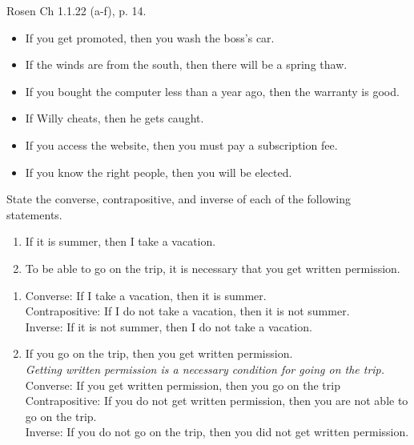 \begin{questions}
 Rosen Ch 1.1.22 (a-f), p. 14.
    \ifprintanswers
        \vspace{-10pt}
    \fi
    \begin{solution}
    \begin{itemize}[itemsep=0pt,parsep=0pt,
    topsep=0pt,partopsep=0pt]
    	\item If you get promoted, then you wash the boss’s car.
        \item If the winds are from the south, then there will be a spring thaw.
    	\item If you bought the computer less than a year ago, then the warranty is good.
    	\item If Willy cheats, then he gets caught.
        \item If you access the website, then you must pay a subscription fee.
        \item If you know the right people, then you will be elected.
    \end{itemize}
    \end{solution}



 State the converse, contrapositive, and inverse of each of the following statements.
    \begin{enumerate}[label=(\alph*),itemsep=0pt,parsep=0pt,topsep=0pt,partopsep=0pt]
        \item If it is summer, then I take a vacation.
        \item To be able to go on the trip, it is necessary that you get written permission.
    \end{enumerate}
    \ifprintanswers
        \vspace{-10pt}
    \fi
    \begin{solution}
    \begin{enumerate}[label=(\alph*),itemsep=0pt,parsep=0pt,topsep=0pt,partopsep=0pt]
        \item Converse: If I take a vacation, then it is summer. \\
            Contrapositive: If I do not take a vacation, then it is not summer. \\
            Inverse: If it is not summer, then I do not take a vacation. 
        \medskip
        \item If you go on the trip, then you get written permission. \\
            \textit{Getting written permission is a necessary condition for going on the trip.} \\
            Converse: If you get written permission, then you go on the trip \\
            Contrapositive: If you do not get written permission, then you are not able to go on the trip. \\
            Inverse: If you do not go on the trip, then you did not get written permission.
    \end{enumerate}
    \end{solution}




\end{questions}
